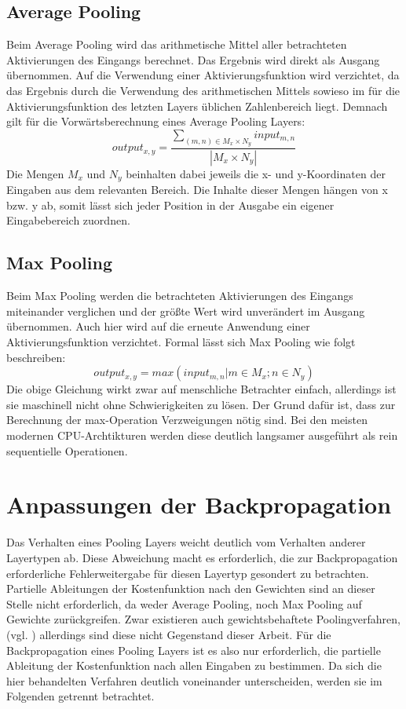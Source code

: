 \documentclass[../main.tex]{subfiles}
\begin{document}
\subsection{Average Pooling}
Beim Average Pooling wird das arithmetische Mittel aller betrachteten Aktivierungen des Eingangs berechnet. Das Ergebnis wird direkt als Ausgang übernommen. Auf die Verwendung einer Aktivierungsfunktion wird verzichtet, da das Ergebnis durch die Verwendung des arithmetischen Mittels sowieso im für die Aktivierungsfunktion des letzten Layers üblichen Zahlenbereich liegt. Demnach gilt für die Vorwärtsberechnung eines Average Pooling Layers: 
\begin{equation} \label{eq:averagepooling}
output_{x, y} = \frac{\sum\limits_{(m, n)\in{M_x}\times{N_y}} input_{m, n}}{|M_x\times{N_y}|}
\end{equation}
Die Mengen \(M_x\) und \(N_y\) beinhalten dabei jeweils die x- und y-Koordinaten der Eingaben aus dem relevanten Bereich. Die Inhalte dieser Mengen hängen von x bzw. y ab, somit lässt sich jeder Position in der Ausgabe ein eigener Eingabebereich zuordnen. 

\subsection{Max Pooling} \label{maxpool_forward}
Beim Max Pooling werden die betrachteten Aktivierungen des Eingangs miteinander verglichen und der größte Wert wird unverändert im Ausgang übernommen. Auch hier wird auf die erneute Anwendung einer Aktivierungsfunktion verzichtet. Formal lässt sich Max Pooling wie folgt beschreiben: 
\begin{equation} \label{eq:maxpooling}
output_{x, y} = max( {input_{m,n} | m \in M_x; n \in N_y})
\end{equation}
Die obige Gleichung wirkt zwar auf menschliche Betrachter einfach, allerdings ist sie maschinell nicht ohne Schwierigkeiten zu lösen. Der Grund dafür ist, dass zur Berechnung der max-Operation Verzweigungen nötig sind. Bei den meisten modernen CPU-Archtikturen werden diese deutlich langsamer ausgeführt als rein sequentielle Operationen. 

\section{Anpassungen der Backpropagation}
Das Verhalten eines Pooling Layers weicht deutlich vom Verhalten anderer Layertypen ab. Diese Abweichung macht es erforderlich, die zur Backpropagation erforderliche Fehlerweitergabe für diesen Layertyp gesondert zu betrachten. Partielle Ableitungen der Kostenfunktion nach den Gewichten sind an dieser Stelle nicht erforderlich, da weder Average Pooling, noch Max Pooling auf Gewichte zurückgreifen. Zwar existieren auch gewichtsbehaftete Poolingverfahren, (vgl. \cite{paperMixedPooling}) allerdings sind diese nicht Gegenstand dieser Arbeit. Für die Backpropagation eines Pooling Layers ist es also nur erforderlich, die partielle Ableitung der Kostenfunktion nach allen Eingaben zu bestimmen. Da sich die hier behandelten Verfahren deutlich voneinander unterscheiden, werden sie im Folgenden getrennt betrachtet. 
\end{document}
